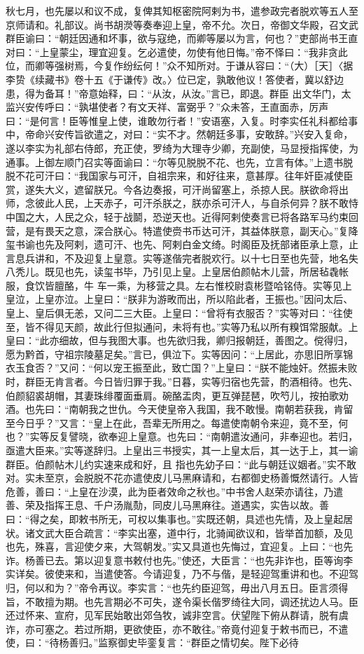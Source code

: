 \documentclass{article}
\begin{document}
秋七月，也先屡以和议不成，复俾其知枢密院阿剌为书，遣参政完者脱欢等五人至京师请和。礼部议。尚书胡濙等奏奉迎上皇，帝不允。次日，帝御文华殿，召文武群臣谕曰：“朝廷因通和坏事，欲与寇绝，而卿等屡以为言，何也？”吏部尚书王直对曰：“上皇蒙尘，理宜迎复。乞必遣使，勿使有他日悔。”帝不怿曰：“我非贪此位，而卿等强树焉，今复作纷纭何！”众不知所对。于谦从容曰：“（大）［天］〈据李贽《续藏书》卷十五《于谦传》改。〉位已定，孰敢他议！答使者，冀以舒边患，得为备耳！”帝意始释，曰：“从汝，从汝。”言已，即退。群臣
\newpage
出文华门，太监兴安传呼曰：“孰堪使者？有文天祥、富弼乎？”众未答，王直面赤，厉声曰：“是何言！臣等惟皇上使，谁敢勿行者！”安语塞，入复。时李实任礼科都给事中，帝命兴安传旨欲遣之，对曰：“实不才。然朝廷多事，安敢辞。”兴安入复命，遂以李实为礼部右侍郎，充正使，罗绮为大理寺少卿，充副使，马显授指挥使，为通事。上御左顺门召实等面谕曰：“尔等见脱脱不花、也先，立言有体。”上遗书脱脱不花可汗曰：“我国家与可汗，自祖宗来，和好往来，意甚厚。往年奸臣减使臣赏，遂失大义，遮留朕兄。今各边奏报，可汗尚留塞上，杀掠人民。朕欲命将出师，念彼此人民，上天赤子，可汗杀朕之，朕亦杀可汗人，与自杀何异？朕不敢恃中国之大，人民之众，轻于战鬬，恐逆天也。近得阿剌使奏言已将各路军马约束回营，是有畏天之意，深合朕心。特遣使赍书币达可汗，其益体朕意，副天心。”复降玺书谕也先及阿剌，遗可汗、也先、阿剌白金文绮。时阁臣及抚部诸臣承上意，止言息兵讲和，不及迎复上皇意。实等遂偕完者脱欢行。以十七日至也先营，地名失八秃儿。既见也先，读玺书毕，乃引见上皇。上皇居伯颜帖木儿营，所居毡毳帐服，食饮皆膻酪，牛
\newpage
车一乘，为移营之具。左右惟校尉袁彬暨哈铭侍。实等见上皇泣，上皇亦泣。上皇曰：“朕非为游畋而出，所以陷此者，王振也。”因问太后、皇上、皇后俱无恙，又问二三大臣。上皇曰：“曾将有衣服否？”实等对曰：“往使至，皆不得见天颜，故此行但拟通问，未将有也。”实等乃私以所有糗饵常服献。上皇曰：“此亦细故，但与我图大事。也先欲归我，卿归报朝廷，善图之。傥得归，愿为黔首，守祖宗陵墓足矣。”言已，俱泣下。实等因问：“上居此，亦思旧所享锦衣玉食否？”又问：“何以宠王振至此，致亡国？”上皇曰：“朕不能烛奸。然振未败时，群臣无肯言者。今日皆归罪于我。”日暮，实等归宿也先营，酌酒相待。也先、伯颜貂裘胡帽，其妻珠绯覆面垂肩。碗酪盂肉，更互弹琵琶，吹𥫩儿，按拍歌劝酒。也先曰：“南朝我之世仇。今天使皇帝入我国，我不敢慢。南朝若获我，肯留至今日乎？”又言：“皇上在此，吾辈无所用之。每遣使南朝令来迎，竟不至，何也？”实等反复譬晓，欲奉迎上皇意。也先曰：“南朝遣汝通问，非奉迎也。若归，亟遣大臣来。”实等遂辞归。上皇出三书授实，其一上皇太后，其一达于上，其一谕群臣。伯颜帖木儿约实速来成和好，且
\newpage
指也先幼子曰：“此与朝廷议姻者。”实不敢对。实未至京，会脱脱不花亦遣使皮儿马黑麻请和，右都御史杨善慨然请行。人皆危善，善曰：“上皇在沙漠，此为臣者效命之秋也。”中书舍人赵荣亦请往，乃遣善、荣及指挥王息、千户汤胤𪟝，同皮儿马黑麻往。道遇实，实告以故。善曰：“得之矣，即敕书所无，可权以集事也。”实既还朝，具述也先情，及上皇起居状。诸文武大臣合疏言：“李实出塞，道中行，北骑闻欲议和，皆举首加额，及见也先，殊喜，言迎使夕来，大驾朝发。”实又具道也先悔过，宜迎复。上曰：“也先诈。杨善已去。第以迎复意书敕付也先。”使还，大臣言：“也先非诈也，臣等询李实详矣。彼使来和，当遣使答。今请迎复，乃不与偕，是轻迎驾重讲和也。不迎驾归，何以和为？”帝令再议。李实言：“也先约臣迎驾，毋出八月五日。臣言须得旨，不敢擅为期。也先言期必不可失，遂令渠长偕罗绮往大同，调还扰边人马。臣还过怀来、宣府，见军民始敢出郊刍牧，诚非空言。伏望陛下俯从群请，脱有虞诈，亦可塞之。若过所期，更欲使臣，亦不敢往。”帝竟付迎复于敕书而已，不遣使，曰：“待杨善归。”监察御史毕銮复言：“群臣之情切矣。陛下必待
\end{document}
